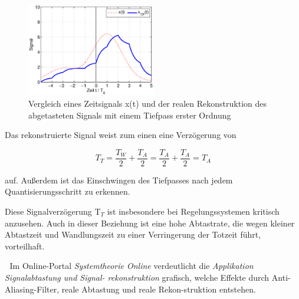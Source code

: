 \begin{figure}[H]
  \centerline{\includegraphics[width=0.5\textwidth]{Kapitel1/Bilder/image19}}
  \caption{Vergleich eines Zeitsignals x(t) und der realen Rekonstruktion des abgetasteten Signals mit einem Tiefpass erster Ordnung}
  \label{fig:RekonstruktionRealSignalTiefpass}
\end{figure}

\noindent Das rekonstruierte Signal weist zum einen eine Verzögerung von

\begin{equation}\label{eq:twothirtythree}
T_{T} =\frac{T_{W} }{2} +\frac{T_{A} }{2} =\frac{T_{A} }{2} +\frac{T_{A} }{2} =T_{A}
\end{equation}

\noindent auf. Au{\ss}erdem ist das Einschwingen des Tiefpasses nach jedem Quantisierungsschritt zu erkennen. 

\noindent Diese Signalverzögerung T${}_{T}$ ist insbesondere bei Regelungssystemen kritisch anzusehen. Auch in dieser Beziehung ist eine hohe Abtastrate, die wegen kleiner Abtastzeit und Wandlungszeit zu einer Verringerung der Totzeit führt, vorteilhaft.

\textcolor{white}{.}\newline
\noindent Im Online-Portal \textit{Systemtheorie Online} verdeutlicht die \textit{Applikation Signalabtastung und Signal-
rekonstruktion} grafisch, welche Effekte durch Anti-Aliasing-Filter, reale Abtastung und reale Rekon-struktion entstehen.\newline    

\clearpage

